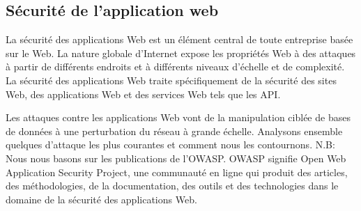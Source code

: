 \subsection{Sécurité de l'application web}
    La sécurité des applications Web est un élément central de 
    toute entreprise basée sur le Web. La nature globale d'Internet 
    expose les propriétés Web à des attaques à partir de différents 
    endroits et à différents niveaux d'échelle et de complexité. 
    La sécurité des applications Web traite spécifiquement de la 
    sécurité des sites Web, des applications Web et des services 
    Web tels que les API.
    \par 
    Les attaques contre les applications Web vont de la manipulation 
    ciblée de bases de données à une perturbation du réseau à grande 
    échelle. Analysons ensemble quelques d’attaque les plus courantes
    et comment nous les contournons. N.B: Nous nous basons sur les publications
    de l'OWASP.
    OWASP signifie Open Web Application Security Project, une communauté 
    en ligne qui produit des articles, des méthodologies, de la documentation, 
    des outils et des technologies dans le domaine de la sécurité des applications 
    Web.
    
    

